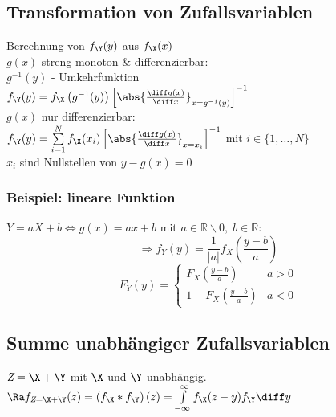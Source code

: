 \documentclass[german,color,6pt]{latex4ei/latex4ei_sheet}
\begin{document}
\begin{sectionbox}
	\subsection{Transformation von Zufallsvariablen}
	Berechnung von $f_{\Y}(y)$ aus $f_{\X}(x)$\\
	$g(x)$ streng monoton \& differenzierbar:\\
	$g^{-1}(y)$ - Umkehrfunktion\\
	$f_{\Y}(y) = f_{\X}\left(g^{-1}(y)\right)\left[\abs{\frac{\diff g(x)}{\diff x}}_{x = g^{-1}(y)}\right]^{-1}$\\
	$g(x)$ nur differenzierbar:\\
	$f_{\Y}(y) = \sum\limits_{i = 1}^{N}{f_{\X}(x_i)\left[\abs{\frac{\diff g(x)}{\diff x}}_{x = x_i}\right]^{-1}}$ mit $i \in \{1,\dots,N\}$ \\
	$x_i$ sind Nullstellen von $y - g(x) = 0$
	\subsubsection{Beispiel: lineare Funktion}
	$Y=aX+b \Leftrightarrow g(x)=ax+b$ mit $a\in\mathbb{R}\backslash 0,\;b\in\mathbb{R}$:
	\[\Rightarrow f_Y(y)=\frac{1}{|a|}f_X\left(\frac{y-b}{a}\right)\]
	\[F_Y(y)=\begin{cases}F_X\left(\frac{y-b}{a}\right) & a>0 \\ 1-F_X\left(\frac{y-b}{a}\right) & a<0\end{cases}\]

\end{sectionbox}

\begin{sectionbox}
	\subsection{Summe unabhängiger Zufallsvariablen}
	$\textit{Z} = \X + \Y$ mit $\X$ und $\Y$ unabhängig.\\
	$\Ra f_{\textit{Z} = \X + \Y}(z) = \left(f_{\X} \ast f_{\Y}\right)(z) = \int\limits_{-\infty}^{\infty}{f_{\X}(z-y)f_{\Y}\diff y}$
\end{sectionbox}



\end{document}
